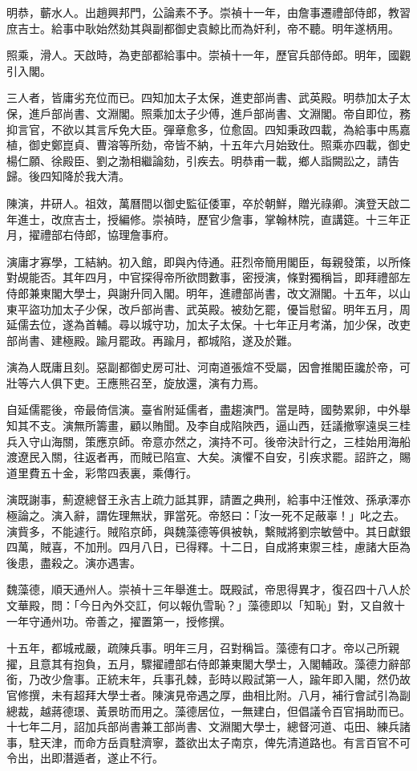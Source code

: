\begin{pinyinscope}
明恭，蘄水人。出趙興邦門，公論素不予。崇禎十一年，由詹事遷禮部侍郎，教習庶吉士。給事中耿始然劾其與副都御史袁鯨比而為奸利，帝不聽。明年遂柄用。

照乘，滑人。天啟時，為吏部都給事中。崇禎十一年，歷官兵部侍郎。明年，國觀引入閣。

三人者，皆庸劣充位而已。四知加太子太保，進吏部尚書、武英殿。明恭加太子太保，進戶部尚書、文淵閣。照乘加太子少傅，進戶部尚書、文淵閣。帝自即位，務抑言官，不欲以其言斥免大臣。彈章愈多，位愈固。四知秉政四載，為給事中馬嘉植，御史鄭崑貞、曹溶等所劾，帝皆不納，十五年六月始致仕。照乘亦四載，御史楊仁願、徐殿臣、劉之渤相繼論劾，引疾去。明恭甫一載，鄉人詣闕訟之，請告歸。後四知降於我大清。

陳演，井研人。祖效，萬曆間以御史監征倭軍，卒於朝鮮，贈光祿卿。演登天啟二年進士，改庶吉士，授編修。崇禎時，歷官少詹事，掌翰林院，直講筵。十三年正月，擢禮部右侍郎，協理詹事府。

演庸才寡學，工結納。初入館，即與內侍通。莊烈帝簡用閣臣，每親發策，以所條對覘能否。其年四月，中官探得帝所欲問數事，密授演，條對獨稱旨，即拜禮部左侍郎兼東閣大學士，與謝升同入閣。明年，進禮部尚書，改文淵閣。十五年，以山東平盜功加太子少保，改戶部尚書、武英殿。被劾乞罷，優旨慰留。明年五月，周延儒去位，遂為首輔。尋以城守功，加太子太保。十七年正月考滿，加少保，改吏部尚書、建極殿。踰月罷政。再踰月，都城陷，遂及於難。

演為人既庸且刻。惡副都御史房可壯、河南道張煊不受屬，因會推閣臣讒於帝，可壯等六人俱下吏。王應熊召至，旋放還，演有力焉。

自延儒罷後，帝最倚信演。臺省附延儒者，盡趨演門。當是時，國勢累卵，中外舉知其不支。演無所籌畫，顧以賄聞。及李自成陷陜西，逼山西，廷議撤寧遠吳三桂兵入守山海關，策應京師。帝意亦然之，演持不可。後帝決計行之，三桂始用海船渡遼民入關，往返者再，而賊已陷宣、大矣。演懼不自安，引疾求罷。詔許之，賜道里費五十金，彩幣四表裏，乘傳行。

演既謝事，薊遼總督王永吉上疏力詆其罪，請置之典刑，給事中汪惟效、孫承澤亦極論之。演入辭，謂佐理無狀，罪當死。帝怒曰：「汝一死不足蔽辜！」叱之去。演貲多，不能遽行。賊陷京師，與魏藻德等俱被執，繫賊將劉宗敏營中。其日獻銀四萬，賊喜，不加刑。四月八日，已得釋。十二日，自成將東禦三桂，慮諸大臣為後患，盡殺之。演亦遇害。

魏藻德，順天通州人。崇禎十三年舉進士。既殿試，帝思得異才，復召四十八人於文華殿，問：「今日內外交訌，何以報仇雪恥？」藻德即以「知恥」對，又自敘十一年守通州功。帝善之，擢置第一，授修撰。

十五年，都城戒嚴，疏陳兵事。明年三月，召對稱旨。藻德有口才。帝以己所親擢，且意其有抱負，五月，驟擢禮部右侍郎兼東閣大學士，入閣輔政。藻德力辭部銜，乃改少詹事。正統末年，兵事孔棘，彭時以殿試第一人，踰年即入閣，然仍故官修撰，未有超拜大學士者。陳演見帝遇之厚，曲相比附。八月，補行會試引為副總裁，越蔣德璟、黃景昉而用之。藻德居位，一無建白，但倡議令百官捐助而已。十七年二月，詔加兵部尚書兼工部尚書、文淵閣大學士，總督河道、屯田、練兵諸事，駐天津，而命方岳貢駐濟寧，蓋欲出太子南京，俾先清道路也。有言百官不可令出，出即潛遁者，遂止不行。


\end{pinyinscope}
